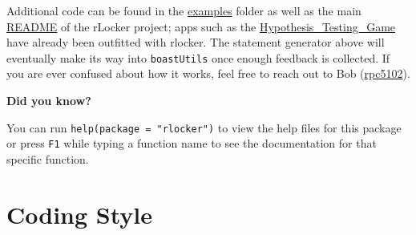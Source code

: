 \documentclass[
]{book}
\newenvironment{Shaded}{\begin{snugshade}}{\end{snugshade}}
\newcommand{\CommentTok}[1]{\textcolor[rgb]{0.56,0.35,0.01}{\textit{#1}}}
\newcommand{\DataTypeTok}[1]{\textcolor[rgb]{0.13,0.29,0.53}{#1}}
\newcommand{\KeywordTok}[1]{\textcolor[rgb]{0.13,0.29,0.53}{\textbf{#1}}}
\newcommand{\NormalTok}[1]{#1}
\newcommand{\OperatorTok}[1]{\textcolor[rgb]{0.81,0.36,0.00}{\textbf{#1}}}
\newcommand{\OtherTok}[1]{\textcolor[rgb]{0.56,0.35,0.01}{#1}}
\newcommand{\RegionMarkerTok}[1]{#1}
\newcommand{\StringTok}[1]{\textcolor[rgb]{0.31,0.60,0.02}{#1}}
\begin{document}
\begin{Shaded}
\end{Shaded}

Additional code can be found in the \href{https://github.com/rpc5102/rlocker/tree/master/inst/examples}{examples} folder as well as the main \href{https://github.com/rpc5102/rlocker/blob/master/README.md}{README} of the rLocker project; apps such as the \href{https://github.com/EducationShinyAppTeam/Hypothesis_Testing_Game}{Hypothesis\_Testing\_Game} have already been outfitted with rlocker. The statement generator above will eventually make its way into \texttt{boastUtils} once enough feedback is collected. If you are ever confused about how it works, feel free to reach out to Bob (\href{mailto:rpc5102@psu.edu}{rpc5102}).

\textbf{Did you know?}

You can run \texttt{help(package\ =\ "rlocker")} to view the help files for this package or press \texttt{F1} while typing a function name to see the documentation for that specific function.

\hypertarget{codingb}{%
\chapter{Coding Style}\label{codingb}}
\end{document}

